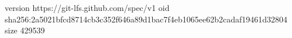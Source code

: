 version https://git-lfs.github.com/spec/v1
oid sha256:2a5021bfcd8714cb3c352f646a89d1bac7f4eb1065ee62b2cadaf19461d32804
size 429539
